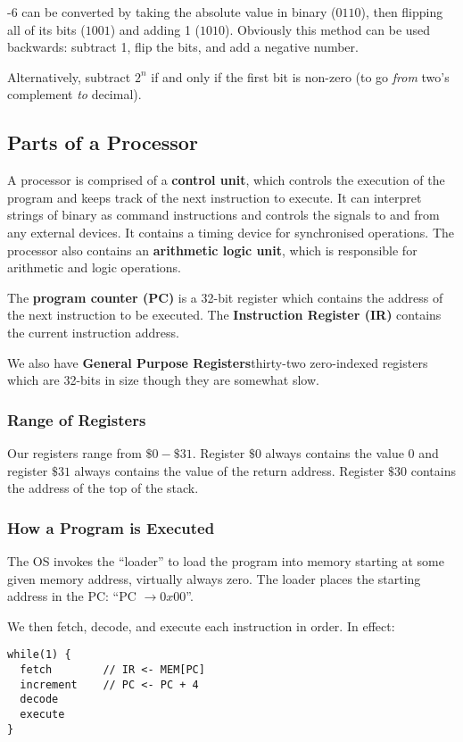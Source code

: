\documentclass[12pt]{article}
\begin{document}
-6 can be converted by taking the absolute value in binary ($0110$), then flipping all of its bits ($1001$) and adding 1 ($1010$). Obviously this method can be used backwards: subtract 1, flip the bits, and add a negative number.

Alternatively, subtract $2^n$ if and only if the first bit is non-zero (to go {\it from} two's complement {\it to} decimal).

\subsection*{Parts of a Processor}
A processor is comprised of a {\bf control unit}, which controls the execution of the program and keeps track of the next instruction to execute. It can interpret strings of binary as command instructions and controls the signals to and from any external devices. It contains a timing device for synchronised operations. The processor also contains an {\bf arithmetic logic unit}, which is responsible for arithmetic and logic operations.

The {\bf program counter (PC)} is a 32-bit register which contains the address of the next instruction to be executed. The {\bf Instruction Register (IR)} contains the current instruction address.

We also have {\bf General Purpose Registers}{thirty-two zero-indexed registers which are 32-bits in size} though they are somewhat slow.

\subsubsection*{Range of Registers}
Our registers range from $\$0 - \$31$. Register $\$0$ always contains the value $0$ and register $\$31$ always contains the value of the return address. Register $\$30$ contains the address of the top of the stack.

\subsubsection*{How a Program is Executed}
The OS invokes the ``loader'' to load the program into memory starting at some given memory address, virtually always zero. The loader places the starting address in the PC: ``PC $\rightarrow 0x00$''.

We then fetch, decode, and execute each instruction in order. In effect:

\begin{verbatim}
while(1) {
  fetch        // IR <- MEM[PC]
  increment    // PC <- PC + 4
  decode
  execute
}
\end{verbatim}
\end{document}
